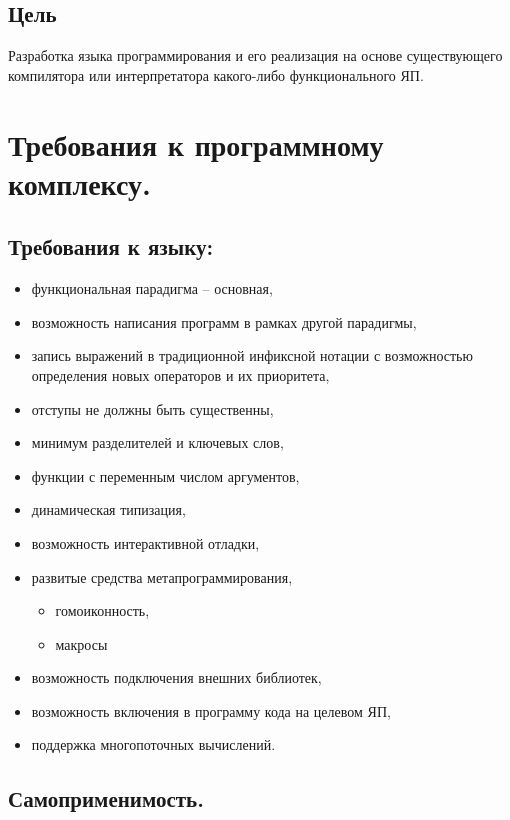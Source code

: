 \documentclass[12pt,a4paper,oneside]{extarticle}
\begin{document}
    \subsection{Цель}
        Разработка языка программирования и его реализация на основе существующего компилятора или интерпретатора какого-либо функционального ЯП.

\section{Требования к программному комплексу.}
    \subsection{Требования к языку:}
        \begin{itemize}
            \item функциональная парадигма -- основная,
            \item возможность написания программ в рамках другой парадигмы,
            \item запись выражений в традиционной инфиксной нотации с возможностью определения новых операторов и их приоритета,
            \item отступы не должны быть существенны,
            \item минимум разделителей и ключевых слов,
            \item функции с переменным числом аргументов,
            \item динамическая типизация,
            \item возможность интерактивной отладки,
            \item развитые средства метапрограммирования,
                \begin{itemize}
                    \item гомоиконность,
                    \item макросы
                \end{itemize}
            \item возможность подключения внешних библиотек,
            \item возможность включения в программу кода на целевом ЯП,
            \item поддержка многопоточных вычислений.
        \end{itemize}
    \subsection{Самоприменимость.}
\end{document}
